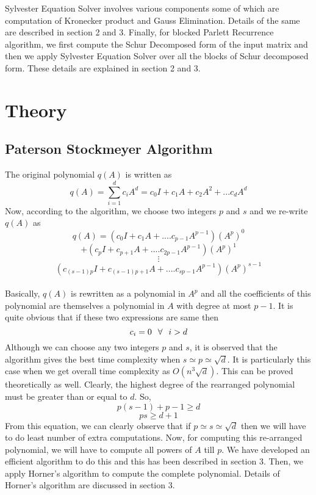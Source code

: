 \documentclass[12pt,a4paper]{article}
\begin{document}
Sylvester Equation Solver involves various components some of which are computation of Kronecker product and Gauss Elimination. Details of the same are described in section 2 and 3. Finally, for blocked Parlett Recurrence algorithm, we first compute the Schur Decomposed form of the input matrix and then we apply Sylvester Equation Solver over all the blocks of Schur decomposed form. These details are explained in section 2 and 3.

\newpage
\section{Theory}\label{sec:lit-rev}

\subsection{Paterson Stockmeyer Algorithm}

The original polynomial $q(A)$ is written as 
$$q(A) = \sum_{i=1}^{d} c_{i}A^{d} = c_{0}I + c_{1}A + c_{2}A^{2} + ... c_{d}A^{d}$$
Now, according to the algorithm, we choose two integers $p$ and $s$ and we re-write $q(A)$ as
$$q(A) = (c_{0}I + c_{1}A + .... c_{p-1}A^{p-1})(A^{p})^{0}$$ $$ + (c_{p}I + c_{p+1}A + .... c_{2p-1}A^{p-1})(A^{p})^{1}$$ $$\vdots$$ $$(c_{(s-1)p}I + c_{(s-1)p+1}A + .... c_{sp-1}A^{p-1})(A^{p})^{s-1}$$
\\
Basically, $q(A)$ is rewritten as a polynomial in $A^{p}$ and all the coefficients of this polynomial are themselves a polynomial in $A$ with degree at most $p-1$. It is quite obvious that if these two expressions are same then 
$$c_{i} = 0 \hspace{0.25cm} \forall \hspace{0.25cm} i > d$$ 
Although we can choose any two integers $p$ and $s$, it is observed that the algorithm gives the best time complexity when $s \simeq p \simeq \sqrt{d}$. It is particularly this case when we get overall time complexity as $O(n^{3}\sqrt{d})$. This can be proved theoretically as well. Clearly, the highest degree of the rearranged polynomial must be greater than or equal to $d$. So, 
$$p(s-1) + p-1 \geq d$$
$$ps \geq d+1$$
From this equation, we can clearly observe that if $p \simeq s \simeq \sqrt{d}$ then we will have to do least number of extra computations. Now, for computing this re-arranged polynomial, we will have to compute all powers of $A$ till $p$. We have developed an efficient algorithm to do this and this has been described in section 3. Then, we apply Horner's algorithm to compute the complete polynomial. Details of Horner's algorithm are discussed in section 3.
\newpage
\end{document}
